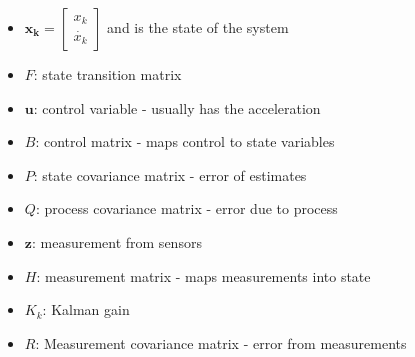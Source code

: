 \documentclass{article}
\begin{document}
\begin{itemize}
    \item $\bm{x_k} = \begin{bmatrix}
        x_k \\
        \dot{x_k}
    \end{bmatrix}$ and is the state of the system
    \item $F$: state transition matrix
    \item $\bm{u}$: control variable - usually has the acceleration
    \item $B$: control matrix - maps control to state variables
    \item $P$: state covariance matrix - error of estimates
    \item $Q$: process covariance matrix - error due to process
    \item $\bm{z}$: measurement from sensors
    \item $H$: measurement matrix - maps measurements into state
    \item $K_k$: Kalman gain
    \item $R$: Measurement covariance matrix - error from measurements
\end{itemize}
\end{document}
